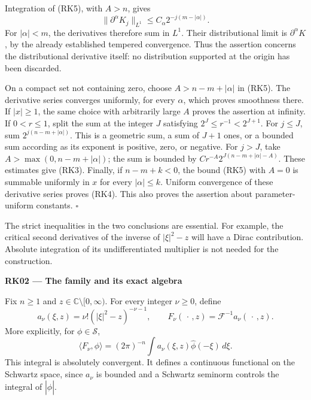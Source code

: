 \documentclass[
  11pt,
]{article}
\begin{document}
Integration of (RK5), with \(A>n\), gives \[
 \|\partial^\alpha K_j\|_{L^1}
 \leq C_\alpha2^{-j(m-|\alpha|)}.
 \tag{RK6}
\] For \(|\alpha|<m\), the derivatives therefore sum in \(L^1\). Their
distributional limit is \(\partial^\alpha K\), by the already
established tempered convergence. Thus the assertion concerns the
distributional derivative itself: no distribution supported at the
origin has been discarded.

On a compact set not containing zero, choose \(A>n-m+|\alpha|\) in
(RK5). The derivative series converges uniformly, for every \(\alpha\),
which proves smoothness there. If \(|x|\geq1\), the same choice with
arbitrarily large \(A\) proves the assertion at infinity. If
\(0<r\leq1\), split the sum at the integer \(J\) satisfying
\(2^J\leq r^{-1}<2^{J+1}\). For \(j\leq J\), sum
\(2^{j(n-m+|\alpha|)}\). This is a geometric sum, a sum of \(J+1\) ones,
or a bounded sum according as its exponent is positive, zero, or
negative. For \(j>J\), take \(A>\max(0,n-m+|\alpha|)\); the sum is
bounded by \(C r^{-A}2^{J(n-m+|\alpha|-A)}\). These estimates give
(RK3). Finally, if \(n-m+k<0\), the bound (RK5) with \(A=0\) is summable
uniformly in \(x\) for every \(|\alpha|\leq k\). Uniform convergence of
these derivative series proves (RK4). This also proves the assertion
about parameter-uniform constants. \(\square\)

The strict inequalities in the two conclusions are essential. For
example, the critical second derivatives of the inverse of \(|\xi|^2-z\)
will have a Dirac contribution. Absolute integration of its
undifferentiated multiplier is not needed for the construction.

\textbf{RK02 --- The family and its exact algebra}

Fix \(n\geq1\) and \(z\in\mathbb C\setminus[0,\infty)\). For every
integer \(\nu\geq0\), define \[
 a_\nu(\xi,z)=\nu!(|\xi|^2-z)^{-\nu-1},\qquad
 F_\nu(\,\cdot\,,z)=\mathcal F^{-1}a_\nu(\,\cdot\,,z).
 \tag{RK7}
\] More explicitly, for \(\phi\in\mathcal S\), \[
 \langle F_\nu,\phi\rangle
 =(2\pi)^{-n}\int a_\nu(\xi,z)\widehat\phi(-\xi)\,d\xi.
 \tag{RK8}
\] This integral is absolutely convergent. It defines a continuous
functional on the Schwartz space, since \(a_\nu\) is bounded and a
Schwartz seminorm controls the integral of \(|\widehat\phi|\).
\end{document}
